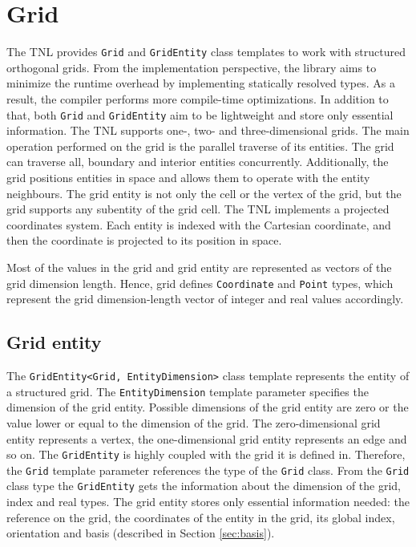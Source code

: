 \chapter{Grid} \label{sec:grid-implementation}

The TNL provides \texttt{Grid} and \texttt{GridEntity} class templates to work with structured orthogonal grids.
From the implementation perspective, the library aims to minimize the runtime overhead by implementing statically resolved types.
As a result, the compiler performs more compile-time optimizations.
In addition to that, both \texttt{Grid} and \texttt{GridEntity} aim to be lightweight and store only essential information.
The TNL supports one-, two- and three-dimensional grids.
The main operation performed on the grid is the parallel traverse of its entities.
The grid can traverse all, boundary and interior entities concurrently.
Additionally, the grid positions entities in space and allows them to operate with the entity neighbours.
The grid entity is not only the cell or the vertex of the grid, but the grid supports any subentity of the grid cell.
The TNL implements a projected coordinates system.
Each entity is indexed with the Cartesian coordinate, and then the coordinate is projected to its position in space.

Most of the values in the grid and grid entity are represented as vectors of the grid dimension length.
Hence, grid defines \texttt{Coordinate} and \texttt{Point} types, which represent the grid dimension-length vector of integer and real values accordingly.

\section{Grid entity}

The \texttt{GridEntity<Grid, EntityDimension>} class template represents the entity of a structured grid.
The \texttt{EntityDimension} template parameter specifies the dimension of the grid entity.
Possible dimensions of the grid entity are zero or the value lower or equal to the dimension of the grid.
The zero-dimensional grid entity represents a vertex, the one-dimensional grid entity represents an edge and so on.
The \texttt{GridEntity} is highly coupled with the grid it is defined in.
Therefore, the \texttt{Grid} template parameter references the type of the \texttt{Grid} class.
From the \texttt{Grid} class type the \texttt{GridEntity} gets the information about the dimension of the grid, index and real types.
The grid entity stores only essential information needed: the reference on the grid, the coordinates of the entity in the grid, its global index, orientation and basis (described in Section \ref{sec:basis}).

